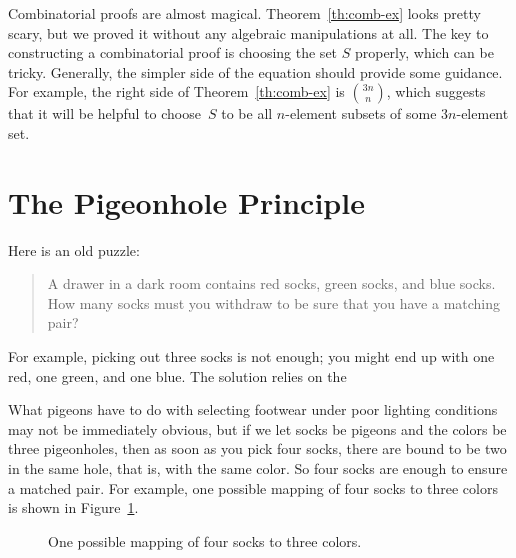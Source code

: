 Combinatorial proofs are almost magical.  Theorem~\ref{th:comb-ex}
looks pretty scary, but we proved it without any algebraic
manipulations at all.  The key to constructing a combinatorial proof
is choosing the set $S$ properly, which can be tricky.  Generally, the
simpler side of the equation should provide some guidance.  For
example, the right side of Theorem~\ref{th:comb-ex} is
$\binom{3n}{n}$, which suggests that it will be helpful to choose~$S$
to be all $n$-element subsets of some $3n$-element set.

\begin{problems}
\classproblems
{}

\homeworkproblems
{}

\end{problems}

\section{The Pigeonhole Principle}\label{pigeon_hole_sec}

Here is an old puzzle:

\begin{quotation}
\noindent A drawer in a dark room contains red socks, green socks, and
blue socks.  How many socks must you withdraw to be sure that you have
a matching pair?
\end{quotation}

For example, picking out three socks is not enough; you might end up
with one red, one green, and one blue.  The solution relies on the


What pigeons have to do with selecting footwear under poor lighting
conditions may not be immediately obvious, but if we let socks be
pigeons and the colors be three pigeonholes, then as soon as you pick
four socks, there are bound to be two in the same hole, that is, with
the same color.  So four socks are enough to ensure a matched
pair.  For example, one possible mapping of four socks to three colors
is shown in Figure~\ref{fig:11P1}.

\begin{figure}


\caption{One possible mapping of four socks to three colors.}

\label{fig:11P1}

\end{figure}

